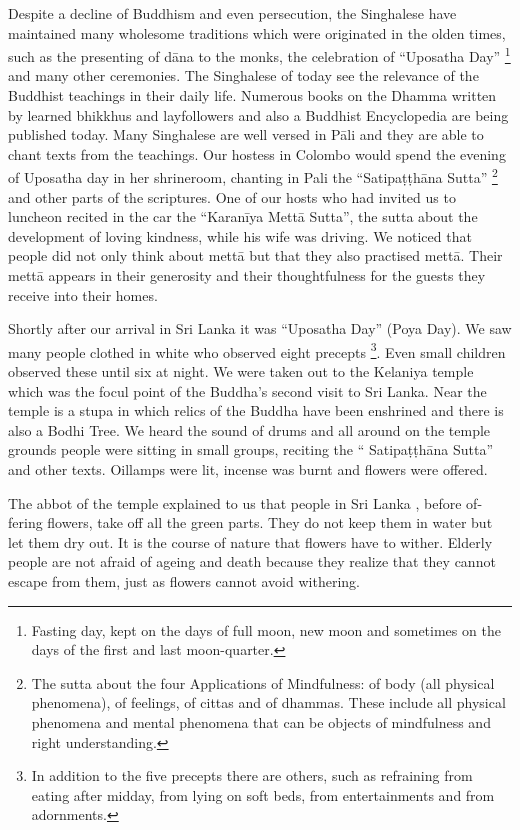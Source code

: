 Despite a decline of Buddhism and even persecution, the Singhalese have
maintained many wholesome traditions which were originated in the olden
times, such as the presenting of dāna to the monks, the celebration of
``Uposatha Day''
\footnote{Fasting day, kept on the days of
full moon, new moon and sometimes on the days of the first and last
moon-quarter.}
and many other ceremonies. The Singhalese of today see the relevance of
the Buddhist teachings in their daily life. Numerous books on the Dhamma
written by learned bhikkhus and layfollowers and also a Buddhist
Encyclopedia are being published today. Many Singhalese are well versed
in Pāli and they are able to chant texts from the teachings. Our hostess
in Colombo would spend the evening of Uposatha day in her shrineroom,
chanting in Pali the ``Satipaṭṭhāna Sutta''
\footnote{The sutta about the four
Applications of Mindfulness: of body (all physical phenomena), of
feelings, of cittas and of dhammas. These include all physical phenomena
and mental phenomena that can be objects of mindfulness and right
understanding.}
and other parts of the scriptures. One of our hosts who had invited us
to luncheon recited in the car the ``Karanīya Mettā Sutta'', the sutta
about the development of loving kindness, while his wife was driving. We
noticed that people did not only think about mettā but that they also
practised mettā. Their mettā appears in their generosity and their
thoughtfulness for the guests they receive into their homes.

Shortly after our arrival in Sri Lanka it was ``Uposatha Day'' (Poya
Day). We saw many people clothed in white who observed eight precepts
\footnote{In addition to the five precepts
there are others, such as refraining from eating after midday, from
lying on soft beds, from entertainments and from adornments.}.
Even small children observed these until six at night. We were taken out
to the Kelaniya temple which was the focul point of the Buddha's second
visit to Sri Lanka. Near the temple is a stupa in which relics of the
Buddha have been enshrined and there is also a Bodhi Tree. We heard the
sound of drums and all around on the temple grounds people were sitting
in small groups, reciting the `` Satipaṭṭhāna Sutta'' and other texts.
Oillamps were lit, incense was burnt and flowers were offered.

The abbot of the temple explained to us that people in Sri Lanka ,
before of- fering flowers, take off all the green parts. They do not
keep them in water but let them dry out. It is the course of nature that
flowers have to wither. Elderly people are not afraid of ageing and
death because they realize that they cannot escape from them, just as
flowers cannot avoid withering.

